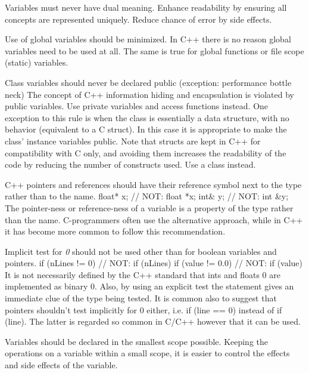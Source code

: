 \recommendation
{Variables must never have dual meaning.}
{}
{Enhance readability by ensuring all concepts are represented uniquely. Reduce chance of error by side effects.}

\recommendation
{Use of global variables should be minimized.}
{}
{In C++ there is no reason global variables need to be used at all. The same is true for global functions or file scope (static) variables.}

\recommendation
{Class variables should never be declared public (exception: performance bottle neck)}
{}
{
	The concept of C++ information hiding and encapsulation is violated by public variables. Use private variables and access functions instead. One exception to this rule is when the class is essentially a data structure, with no behavior (equivalent to a C struct). In this case it is appropriate to make the class' instance variables public.\newline
	Note that structs are kept in C++ for compatibility with C only, and avoiding them increases the readability of the code by reducing the number of constructs used. Use a class instead.
}

\recommendation
{C++ pointers and references should have their reference symbol next to the type rather than to the name.}
{
	float* x; // NOT: float *x;\newline
	int\& y;  // NOT: int \&y;
}
{The pointer-ness or reference-ness of a variable is a property of the type rather than the name. C-programmers often use the alternative approach, while in C++ it has become more common to follow this recommendation.}

\recommendation
{Implicit test for \textit{0} should not be used other than for boolean variables and pointers.}
{
	if (nLines != 0)  // NOT: if (nLines)\newline
	if (value != 0.0) // NOT: if (value)
}
{
	It is not necessarily defined by the C++ standard that ints and floats 0 are implemented as binary 0. Also, by using an explicit test the statement gives an immediate clue of the type being tested.\newline
	It is common also to suggest that pointers shouldn't test implicitly for 0 either, i.e. if (line == 0) instead of if (line). The latter is regarded so common in C/C++ however that it can be used.
}

\recommendation
{Variables should be declared in the smallest scope possible.}
{}
{Keeping the operations on a variable within a small scope, it is easier to control the effects and side effects of the variable.}

